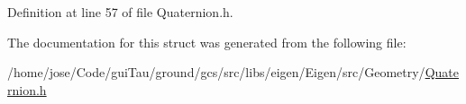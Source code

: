 Definition at line 57 of file Quaternion.\-h.



The documentation for this struct was generated from the following file\-:\begin{DoxyCompactItemize}
\item 
/home/jose/\-Code/gui\-Tau/ground/gcs/src/libs/eigen/\-Eigen/src/\-Geometry/\hyperlink{_quaternion_8h}{Quaternion.\-h}\end{DoxyCompactItemize}
